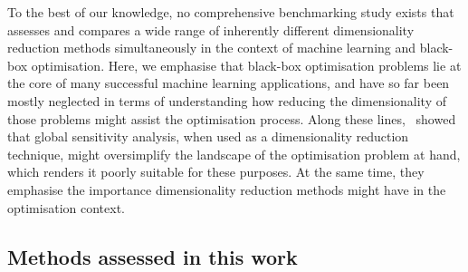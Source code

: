 To the best of our knowledge, no comprehensive benchmarking study exists that assesses and compares a wide range of inherently different dimensionality reduction methods simultaneously in the context of machine learning and black-box optimisation.
Here, we emphasise that black-box optimisation problems lie at the core of many successful machine learning applications, and have so far been mostly neglected in terms of understanding how reducing the dimensionality of those problems might assist the optimisation process. 
Along these lines,~\citet{RapEtAl25} showed that global sensitivity analysis, when used as a dimensionality reduction technique, might oversimplify the landscape of the optimisation problem at hand, which renders it poorly suitable for these purposes. 
At the same time, they emphasise the importance dimensionality reduction methods might have in the optimisation context.









\subsection{Methods assessed in this work}
\label{sec:ch04:dimensionality reduction-methods}


